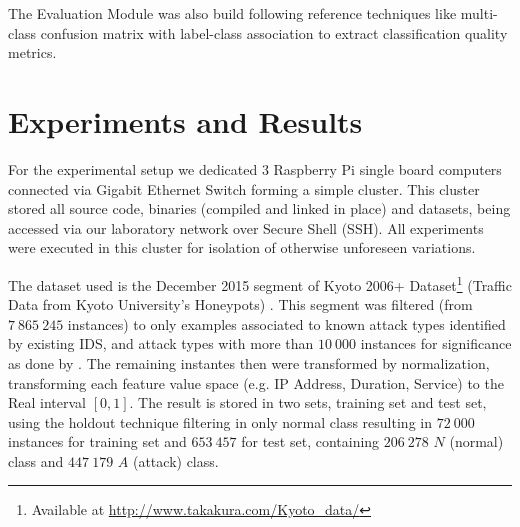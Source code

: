 \documentclass[conference]{IEEEtran}
\begin{document}
The Evaluation Module was also build following reference techniques like
multi-class confusion matrix with label-class association
\cite{Faria2016minas}
to extract classification quality metrics.

\section{Experiments and Results}\label{sec:experiments}

For the experimental setup we dedicated 3 Raspberry Pi single board computers
connected via Gigabit Ethernet Switch forming a simple cluster.
This cluster stored all source code, binaries (compiled and linked in place) and
datasets, being accessed via our laboratory network over Secure Shell (SSH).
All experiments were executed in this cluster for isolation of otherwise unforeseen
variations.

The dataset used is the December 2015 segment of
Kyoto 2006+ Dataset\footnote{Available at \url{http://www.takakura.com/Kyoto_data/}}
(Traffic Data from Kyoto University's Honeypots)
\cite{Song2011}.
This segment was filtered (from $7\:865\:245$ instances) to only examples
associated to known attack types identified by existing IDS, and attack types
with more than $10\:000$ instances for significance as done by \cite{Cassales2019a}.
The remaining instantes then were transformed by normalization, transforming
each feature value space (e.g. IP Address, Duration, Service) to the
Real interval $[0, 1]$.
The result is stored in two sets, training set and test set, using the holdout
technique filtering in only normal class resulting in $72\:000$ instances for
training set and $653\:457$ for test set, containing $206\:278$ $N$ (normal) class
and $447\:179$ $A$ (attack) class.


\end{document}
